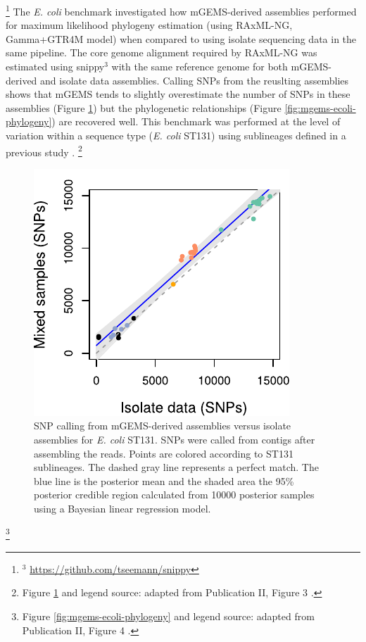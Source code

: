\documentclass[officiallayout]{tktla}
\let\svthefootnote\thefootnote
\begin{document}
\noindent\let\thefootnote\relax\footnote{$^{3}$ \url{https://github.com/tseemann/snippy}}
The \textit{E. coli} benchmark investigated how mGEMS-derived
assemblies performed for maximum likelihood phylogeny estimation
(using RAxML-NG, Gamma+GTR4M model) \citep{kozlov2019raxml} when
compared to using isolate sequencing data in the same pipeline. The
core genome alignment required by RAxML-NG was estimated using
snippy$^{3}$ with the same reference genome for both mGEMS-derived
and isolate data assemblies. Calling SNPs from the reuslting assemblies shows that mGEMS
tends to slightly overestimate the number of SNPs in these assemblies
(Figure \ref{fig:mgems-ecoli-snps}) but the phylogenetic relationships (Figure \ref{fig:mgems-ecoli-phylogeny}) are recovered well. This benchmark was
performed at the level of variation within a sequence type
(\textit{E. coli} ST131) using sublineages defined in a previous study
\citep{kallonen2017systematic}.
\noindent\let\thefootnote\relax\footnote{Figure \ref{fig:mgems-ecoli-snps} and legend source: adapted from Publication II, Figure 3 \citep{maklin_bacterial_2021}.}
\addtocounter{footnote}{-1}\let\thefootnote\svthefootnote
\begin{figure}[!t]
    \centering
    \includegraphics[height=0.33\textheight,width=\textwidth,keepaspectratio]{img/reproduced/MGen2021_mGEMS_Figure_3a.pdf}
    \caption{SNP calling from mGEMS-derived assemblies versus isolate
      assemblies for \textit{E. coli} ST131. SNPs were called from
      contigs after assembling the reads. Points are colored according
      to ST131 sublineages. The dashed gray line represents a perfect
      match. The blue line is the posterior mean and the shaded area
      the 95\% posterior credible region calculated from 10000
      posterior samples using a Bayesian linear regression model.}
  \label{fig:mgems-ecoli-snps}
\end{figure}
\noindent\let\thefootnote\relax\footnote{Figure \ref{fig:mgems-ecoli-phylogeny} and legend source: adapted from Publication II, Figure 4 \citep{maklin_bacterial_2021}.}
\end{document}
